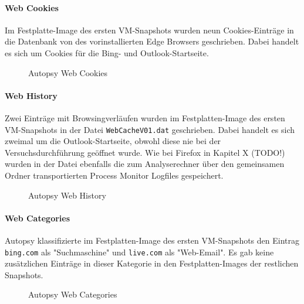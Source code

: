 \begin{appendices}
\paragraph*{Web Cookies}
Im Festplatte-Image des ersten VM-Snapshots wurden neun Cookies-Einträge in die Datenbank von des vorinstallierten Edge Browsers geschrieben. Dabei handelt es sich um Cookies für die Bing- und Outlook-Startseite.
\begin{figure}[h!]
	\centerline{}
	\label{chart:final-criteria}  
	\caption{Autopsy Web Cookies}
\end{figure}

\paragraph*{Web History}
Zwei Einträge mit Browsingverläufen wurden im Festplatten-Image des ersten VM-Snapshots in der Datei \texttt{WebCacheV01.dat} geschrieben. Dabei handelt es sich zweimal um die Outlook-Startseite, obwohl diese nie bei der Versuchsdurchführung geöffnet wurde. Wie bei Firefox in Kapitel X (TODO!) wurden in der Datei ebenfalls die zum Analyserechner über den gemeinsamen Ordner transportierten Process Monitor Logfiles gespeichert.
\begin{figure}[h!]
	\centerline{}
	\label{chart:final-criteria}  
	\caption{Autopsy Web History}
\end{figure}

\paragraph*{Web Categories}
Autopsy klassifizierte im Festplatten-Image des ersten VM-Snapshots den Eintrag \texttt{bing.com} als "Suchmaschine"  und \texttt{live.com} als "Web-Email".
Es gab keine zusätzlichen Einträge in dieser Kategorie in den Festplatten-Images der restlichen Snapshots.
\begin{figure}[h!]
	\centerline{}
	\label{chart:final-criteria}  
	\caption{Autopsy Web Categories}
\end{figure}
		

\end{appendices}
